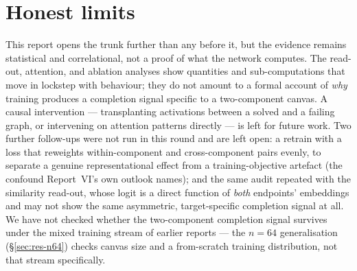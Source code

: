 \documentclass[11pt,a4paper]{article}
\begin{document}
\section{Honest limits}
\label{sec:limits}

This report opens the trunk further than any before it, but the evidence
remains statistical and correlational, not a proof of what the network
computes. The read-out, attention, and ablation analyses show quantities and
sub-computations that move in lockstep with behaviour; they do not amount to
a formal account of \emph{why} training produces a completion signal specific
to a two-component canvas. A causal intervention --- transplanting activations
between a solved and a failing graph, or intervening on attention patterns
directly --- is left for future work. Two further follow-ups were not run
in this round and are left open: a retrain with a loss that reweights
within-component and cross-component pairs evenly, to separate a genuine
representational effect from a training-objective artefact (the confound
Report~VI's own outlook names); and the same audit repeated with the
similarity read-out, whose logit is a direct function of \emph{both}
endpoints' embeddings and may not show the same asymmetric, target-specific
completion signal at all. We have not checked whether the two-component
completion signal survives under the mixed training stream of earlier
reports --- the $n=64$ generalisation (\S\ref{sec:res-n64}) checks canvas size
and a from-scratch training distribution, not that stream specifically.
\end{document}

